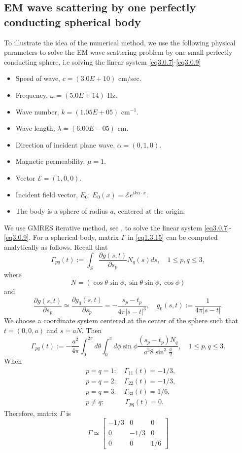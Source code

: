 \documentclass[12pt]{article}
\numberwithin{equation}{section}
\newcommand{\be}{\begin{equation}}
\newcommand{\ee}{\end{equation}}
\begin{document}
\subsection{EM wave scattering by one perfectly conducting spherical body}\label{sec3.1.2}
To illustrate the idea of the numerical method, we use the following physical parameters to solve the EM wave scattering problem by one small perfectly conducting sphere, i.e solving the linear system \eqref{eq3.0.7}-\eqref{eq3.0.9}
\begin{itemize}
     \item Speed of wave, $c=(3.0E+10)$ cm/sec.
     \item Frequency, $\omega=(5.0E+14)$ Hz.
     \item Wave number, $k = (1.05E+05)$ cm$^{-1}$.
     \item Wave length, $\lambda= (6.00E-05)$ cm.
     \item Direction of incident plane wave, $\alpha = (0,  1,  0)$.
     \item Magnetic permeability, $\mu = 1$.
     \item Vector $\mathcal{E} = (1,  0,  0)$.
     \item Incident field vector, $E_0$: $E_{0}(x)=\mathcal{E} e^{ik\alpha\cdot x}$.
     \item The body is a sphere of radius $a$, centered at the origin.
\end{itemize}
We use GMRES iterative method, see \cite{GMRES}, to solve the linear system \eqref{eq3.0.7}-\eqref{eq3.0.9}. For a spherical body, matrix $\Gamma$ in \eqref{eq1.3.15} can be computed analytically as follows. Recall that
\be 
    \Gamma_{pq}(t):=\int_S \frac{\partial g(s,t)}{\partial  s_p}N_q(s) ds, \quad 1\le p,q\le 3,
\ee
where
\be
    N=(\cos\theta \sin\phi,\sin\theta \sin\phi,\cos\phi)
\ee
and
\be
	\frac{\partial g(s,t)}{\partial  s_p} \simeq \frac{\partial g_0(s,t)}{\partial  s_p} = -\frac{s_p-t_p}{4\pi|s-t|^3}, \quad g_0(s,t):=\frac{1}{4\pi|s-t|}.
\ee
We choose a coordinate system centered at the center of the sphere such that $t=(0,0,a)$ and $s=aN$. Then
\be 
    \Gamma_{pq}(t):=-\frac{a^2}{4\pi}\int_0^{2\pi} d\theta \int_0^\pi d\phi \sin\phi \frac{(s_p-t_p)N_q}{a^3 8\sin^3\frac{\phi}{2}}, \quad 1\le p,q\le 3.
\ee
When 
\begin{align}
	&p=q=1: \quad \Gamma_{11}(t) = -1/3, \\ 
	&p=q=2: \quad \Gamma_{22}(t) = -1/3, \\ 
	&p=q=3: \quad \Gamma_{33}(t) = 1/6, \\ 
	&p \neq q: \qquad\quad \Gamma_{pq}(t) = 0.			
\end{align}
Therefore, matrix $\Gamma$ is
\be
	\Gamma\simeq\left[
	\begin{array}{ccc}
	-1/3 & 0 & 0 \\
	0 & -1/3 & 0 \\
	0 & 0 & 1/6
	\end{array}
	\right]
\ee
\end{document}
